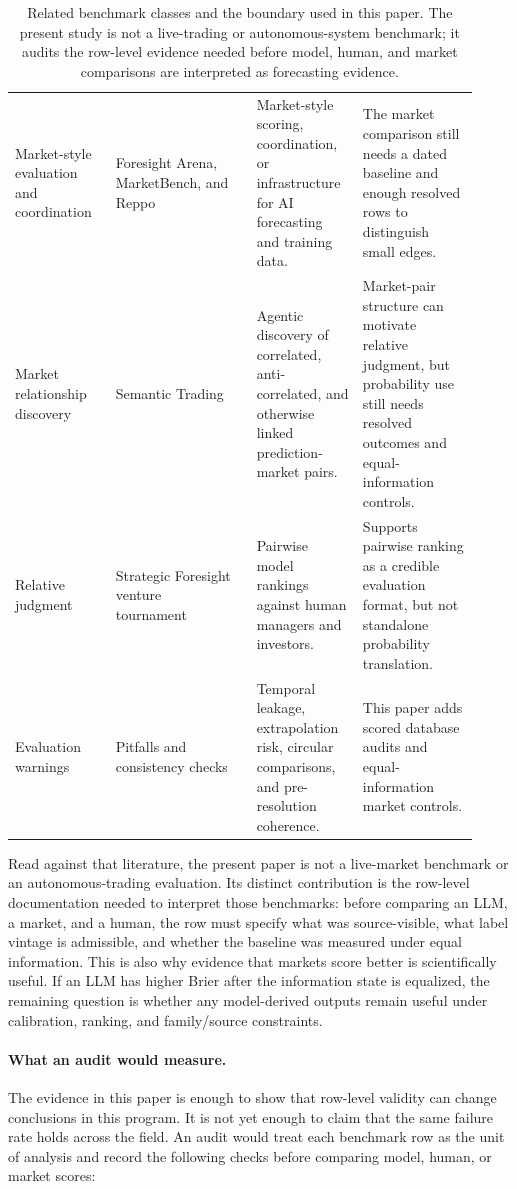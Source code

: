 \documentclass[11pt]{article}
\begin{document}
\begin{table}[p]
\begin{tabular}{@{}L{0.20\linewidth} L{0.28\linewidth} L{0.21\linewidth} L{0.23\linewidth}@{}}
Market-style evaluation and coordination & Foresight Arena, MarketBench, and Reppo~\cite{nechepurenko2026foresight,fradkin2026marketbench,reppo2026} & Market-style scoring, coordination, or infrastructure for AI forecasting and training data. & The market comparison still needs a dated baseline and enough resolved rows to distinguish small edges. \\
Market relationship discovery & Semantic Trading~\cite{capponi2025semantictrading} & Agentic discovery of correlated, anti-correlated, and otherwise linked prediction-market pairs. & Market-pair structure can motivate relative judgment, but probability use still needs resolved outcomes and equal-information controls. \\
Relative judgment & Strategic Foresight venture tournament~\cite{csaszar2026strategicforesight} & Pairwise model rankings against human managers and investors. & Supports pairwise ranking as a credible evaluation format, but not standalone probability translation. \\
Evaluation warnings & Pitfalls and consistency checks~\cite{paleka2025pitfalls,paleka2024consistency} & Temporal leakage, extrapolation risk, circular comparisons, and pre-resolution coherence. & This paper adds scored database audits and equal-information market controls. \\
\bottomrule
\end{tabular}
\endgroup
\caption{Related benchmark classes and the boundary used in this paper. The present study is not a live-trading or autonomous-system benchmark; it audits the row-level evidence needed before model, human, and market comparisons are interpreted as forecasting evidence.}
\label{tab:lit-positioning}
\end{table}

Read against that literature, the present paper is not a live-market benchmark or an autonomous-trading evaluation. Its distinct contribution is the row-level documentation needed to interpret those benchmarks: before comparing an LLM, a market, and a human, the row must specify what was source-visible, what label vintage is admissible, and whether the baseline was measured under equal information. This is also why evidence that markets score better is scientifically useful. If an LLM has higher Brier after the information state is equalized, the remaining question is whether any model-derived outputs remain useful under calibration, ranking, and family/source constraints.


\paragraph{What an audit would measure.} The evidence in this paper is enough to show that row-level validity can change conclusions in this program. It is not yet enough to claim that the same failure rate holds across the field. An audit would treat each benchmark row as the unit of analysis and record the following checks before comparing model, human, or market scores:
\end{document}
